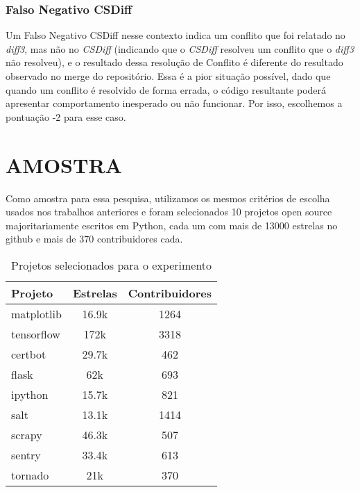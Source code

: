 \subsubsection{Falso Negativo CSDiff}
Um Falso Negativo CSDiff nesse contexto indica um conflito que foi relatado no
\emph{diff3}, mas não no \emph{CSDiff} (indicando que
o \emph{CSDiff} resolveu um conflito que o \emph{diff3} não resolveu),
e o resultado dessa resolução de Conflito é diferente do resultado
observado no merge do repositório. Essa é a pior situação possível,
dado que quando um conflito é resolvido de forma errada,
o código resultante poderá apresentar comportamento inesperado ou não funcionar. Por
isso, escolhemos a pontuação -2 para esse caso.

\section{AMOSTRA}
Como amostra para essa pesquisa, utilizamos os mesmos critérios de escolha
usados nos trabalhos anteriores e foram selecionados 10 projetos open source majoritariamente escritos em Python,
cada um com mais de 13000 estrelas no github e mais de 370 contribuidores cada.

\begin{table}[ht]
	\begin{center}
		\begin{tabular}{|l|c|c|}
			\hline
			\textbf{Projeto} & \textbf{Estrelas} & \textbf{Contribuidores} \\
			\hline
			matplotlib       & 16.9k             & 1264                    \\
			tensorflow       & 172k              & 3318                    \\
			certbot          & 29.7k             & 462                     \\
			flask            & 62k               & 693                     \\
			ipython          & 15.7k             & 821                     \\
			salt             & 13.1k             & 1414                    \\
			scrapy           & 46.3k             & 507                     \\
			sentry           & 33.4k             & 613                     \\
			tornado          & 21k               & 370                     \\
			\hline
		\end{tabular}
	\end{center}
	\caption{Projetos selecionados para o experimento}\label{tabela_projeto}
\end{table}

